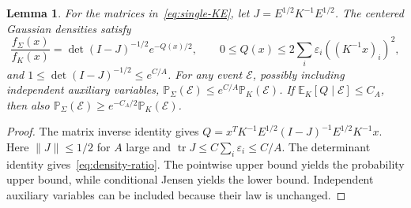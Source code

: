 \documentclass[11pt,letterpaper,reqno]{amsart}
\numberwithin{equation}{section}
\newtheorem{lemma}[theorem]{Lemma}
\theoremstyle{remark}
\begin{document}
\begin{lemma}\label{lem:gaussian-density}
For the matrices in~\eqref{eq:single-KE}, let
$J=E^{1/2}K^{-1}E^{1/2}$. The centered Gaussian densities satisfy
\begin{equation}\label{eq:density-ratio}
\frac{f_\Sigma(x)}{f_K(x)}=\det(I-J)^{-1/2}e^{-Q(x)/2},\qquad
0\le Q(x)\le2\sum_i\varepsilon_i((K^{-1}x)_i)^2,
\end{equation}
and $1\le\det(I-J)^{-1/2}\le e^{C/A}$.
For any event $\mathcal E$, possibly including independent auxiliary variables,
$\mathbb P_\Sigma(\mathcal E)\le e^{C/A}\mathbb P_K(\mathcal E)$.
If $\mathbb E_K[Q\mid\mathcal E]\le C_A$, then also
$\mathbb P_\Sigma(\mathcal E)\ge e^{-C_A/2}\mathbb P_K(\mathcal E)$.
\end{lemma}
\begin{proof}
The matrix inverse identity gives
$Q=x^TK^{-1}E^{1/2}(I-J)^{-1}E^{1/2}K^{-1}x$.
Here $\|J\|\le1/2$ for $A$ large and
$\operatorname{tr}J\le C\sum_i\varepsilon_i\le C/A$.
The determinant identity gives~\eqref{eq:density-ratio}. The pointwise upper bound yields the probability upper bound, while conditional Jensen yields the lower bound. Independent auxiliary variables can be included because their law is unchanged.
\end{proof}
\end{document}
